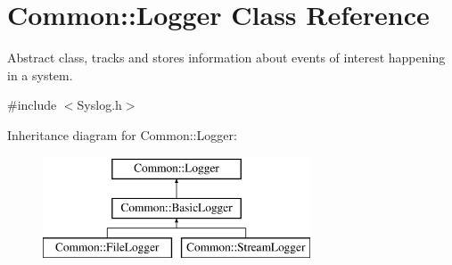 \hypertarget{class_common_1_1_logger}{\section{Common\-:\-:Logger Class Reference}
\label{class_common_1_1_logger}
}


Abstract class, tracks and stores information about events of interest happening in a system.  




{\ttfamily \#include $<$Syslog.\-h$>$}

Inheritance diagram for Common\-:\-:Logger\-:\begin{figure}[H]
\begin{center}
\leavevmode
\includegraphics[height=3.000000cm]{class_common_1_1_logger}
\end{center}
\end{figure}
